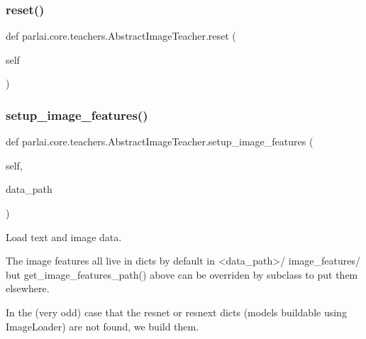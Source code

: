 \subsubsection{\texorpdfstring{reset()}{reset()}}
{\footnotesize\ttfamily def parlai.\+core.\+teachers.\+Abstract\+Image\+Teacher.\+reset (\begin{DoxyParamCaption}\item[{}]{self }\end{DoxyParamCaption})}

\mbox{\label{classparlai_1_1core_1_1teachers_1_1AbstractImageTeacher_aa6ac386d509d428870124c27265363bb}} 
\subsubsection{\texorpdfstring{setup\+\_\+image\+\_\+features()}{setup\_image\_features()}}
{\footnotesize\ttfamily def parlai.\+core.\+teachers.\+Abstract\+Image\+Teacher.\+setup\+\_\+image\+\_\+features (\begin{DoxyParamCaption}\item[{}]{self,  }\item[{}]{data\+\_\+path }\end{DoxyParamCaption})}

\begin{DoxyVerb}Load text and image data.

The image features all live in dicts by default in <data_path>/
image_features/ but get_image_features_path() above can be overriden by
subclass to put them elsewhere.

In the (very odd) case that the resnet or resnext dicts (models
buildable using ImageLoader) are not found, we build them.
\end{DoxyVerb}
 \mbox{\label{classparlai_1_1core_1_1teachers_1_1AbstractImageTeacher_a6095f493a108e30fcf22d36c146cdb8e}} 
